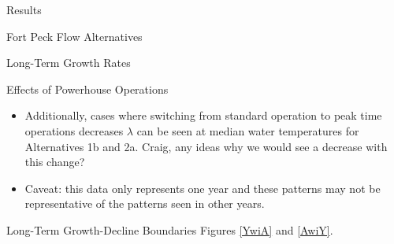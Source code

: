 \documentclass[12pt]{article}
\begin{document}
\begin{section}{Results}
\begin{subsection}{Fort Peck Flow Alternatives}
\begin{subsubsection}{Long-Term Growth Rates}
\begin{paragraph}{Effects of Powerhouse Operations}
\begin{itemize}
\item Additionally, cases where switching from standard operation to peak time operations decreases $\lambda$ can be seen at median water temperatures for Alternatives 1b and 2a.  Craig, any ideas why we would see a decrease with this change?
\item Caveat: this data only represents one year and these patterns may not be representative of the patterns seen in other years.   
\end{itemize}
\end{paragraph}
\end{subsubsection}
\begin{subsubsection}{Long-Term Growth-Decline Boundaries}
Figures \ref{YwiA} and \ref{AwiY}.
\end{subsubsection}
\end{subsection}


\end{section}
\end{document}
